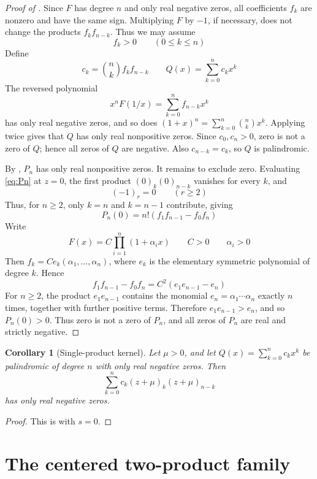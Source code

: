 \documentclass[a4paper,11pt,reqno]{amsart}
\numberwithin{equation}{section}
\newtheorem{corollary}{Corollary}
\theoremstyle{remark}
\begin{document}
\begin{proof}[Proof of ]
Since \(F\) has degree \(n\) and only real negative zeros, all coefficients \(f_k\) are nonzero and have the same sign. Multiplying \(F\) by \(-1\), if necessary, does not change the products \(f_kf_{n-k}\). Thus we may assume
\[
  f_k>0
  \qquad(0\leq k\leq n)
\]
Define
\[
  c_k=\binom nk f_kf_{n-k}
  \qquad
  Q(x)=\sum_{k=0}^{n}c_kx^k
\]
The reversed polynomial
\[
  x^nF(1/x)=\sum_{k=0}^{n}f_{n-k}x^k
\]
has only real negative zeros, and so does \((1+x)^n=\sum_{k=0}^{n}\binom nkx^k\). Applying  twice gives that \(Q\) has only real nonpositive zeros. Since \(c_0,c_n>0\), zero is not a zero of \(Q\); hence all zeros of \(Q\) are negative. Also \(c_{n-k}=c_k\), so \(Q\) is palindromic.

By , \(P_n\) has only real nonpositive zeros. It remains to exclude zero. Evaluating \eqref{eq:Pn} at \(z=0\), the first product \((0)_k(0)_{n-k}\) vanishes for every \(k\), and
\[
  (-1)_r=0\qquad(r\geq2)
\]
Thus, for \(n\geq2\), only \(k=n\) and \(k=n-1\) contribute, giving
\[
  P_n(0)=n!\left(f_1f_{n-1}-f_0f_n\right)
\]
Write
\[
  F(x)=C\prod_{i=1}^{n}(1+\alpha_ix)
  \qquad
  C>0
  \qquad
  \alpha_i>0
\]
Then \(f_k=C e_k(\alpha_1,\ldots,\alpha_n)\), where \(e_k\) is the elementary symmetric polynomial of degree \(k\). Hence
\[
  f_1f_{n-1}-f_0f_n
  =
  C^2\left(e_1e_{n-1}-e_n\right)
\]
For \(n\geq2\), the product \(e_1e_{n-1}\) contains the monomial \(e_n=\alpha_1\cdots\alpha_n\) exactly \(n\) times, together with further positive terms. Therefore \(e_1e_{n-1}>e_n\), and so \(P_n(0)>0\). Thus zero is not a zero of \(P_n\), and all zeros of \(P_n\) are real and strictly negative.
\end{proof}

\begin{corollary}[Single-product kernel]\label{cor:single-product}
Let \(\mu>0\), and let \(Q(x)=\sum_{k=0}^{n}c_kx^k\) be palindromic of degree \(n\) with only real negative zeros. Then
\[
  \sum_{k=0}^{n}c_k(z+\mu)_k(z+\mu)_{n-k}
\]
has only real negative zeros.
\end{corollary}

\begin{proof}
This is  with \(s=0\).
\end{proof}

\section{The centered two-product family}
\end{document}
